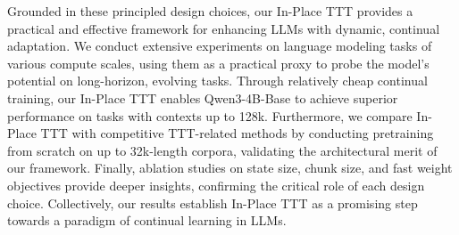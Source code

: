 Grounded in these principled design choices, our In-Place TTT provides a practical and effective framework for enhancing LLMs with dynamic, continual adaptation. We conduct extensive experiments on language modeling tasks of various compute scales, using them as a practical proxy to probe the model's potential on long-horizon, evolving tasks. Through relatively cheap continual training, our In-Place TTT enables Qwen3-4B-Base to achieve superior performance on tasks with contexts up to 128k. Furthermore, we compare In-Place TTT with competitive TTT-related methods by conducting pretraining from scratch on up to 32k-length corpora, validating the architectural merit of our framework. Finally, ablation studies on state size, chunk size, and fast weight objectives provide deeper insights, confirming the critical role of each design choice. Collectively, our results establish In-Place TTT as a promising step towards a paradigm of continual learning in LLMs.